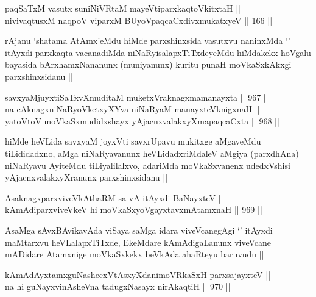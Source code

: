 \begin{shl}
paqSaTxM vasutx suniNiVRtaM mayeVtiparxkaqtoVkitxtaH ||  \\
nivivaqtusxM naqpoV viparxM BUyoV\s paqcaCxdivxmukatxyeV ||  166 ||  
\end{shl}

\begin{artha}
rAjanu `shatama AtAmx'eMdu hiMde parxshinxsida vasutxvu naninxMda `\stext' itAyxdi parxkaqta vacanadiMda niNaRyisalapxTiTxdeyeMdu hiMdakekx hoVgalu bayasida bArxhamxNananunx (muniyanunx) kuritu punaH moVkaSxkAkxgi parxshinxsidanu ||
\end{artha}


\begin{shl}
savxyaMjuyxtiSaTxvXmuditaM muketxVraknagxmamanayxta ||  967 ||  \\
na cAknagxniNaRyoVketxyXYva niNaRyaM manayxteV\s knigxnaH ||  \\
yatoV\s toV moVkaSxmudidxshayx yAjacnxvalakxyXmapaqcaCxta ||  968 ||  
\end{shl}

\begin{artha}
hiMde heVLida savxyaM joyxVti savxrUpavu mukitxge aMgaveMdu tiLididadxno, aMga niNaRyavanunx heVLidadxriMdaleV aMgiya (parxdhAna) niNaRyavu AyiteMdu tiLiyalilalxvo, adariMda moVkaSxvanenx udedxVshisi yAjacnxvalakxyXranunx parxshinxsidanu ||
\end{artha}


\begin{shl}
AsaknagxparxviveVkAthaRM sa vA itAyxdi BaNayxteV || \\
kAmAdiparxviveVkeV hi moVkaSxyoVgayxtavxmAtamxnaH ||  969 ||  
\end{shl}

\begin{artha}
AsaMga sAvxBAvikavAda viSaya saMga idara viveVcanegAgi `\stext' itAyxdi maMtarxvu heVLalapxTiTxde, EkeMdare kAmAdigaLanunx viveVcane mADidare Atamxnige moVkaSxkekx beVkAda ahaRteyu baruvudu ||
\end{artha}

\begin{shl}
kAmAdAyxtamxguNashecxVtAsxyXdanimoVRkaSxH parxsajayxteV || \\
na hi guNayxvinAsheVna tadugxNasayx nirAkaqtiH ||  970 ||  
\end{shl}

